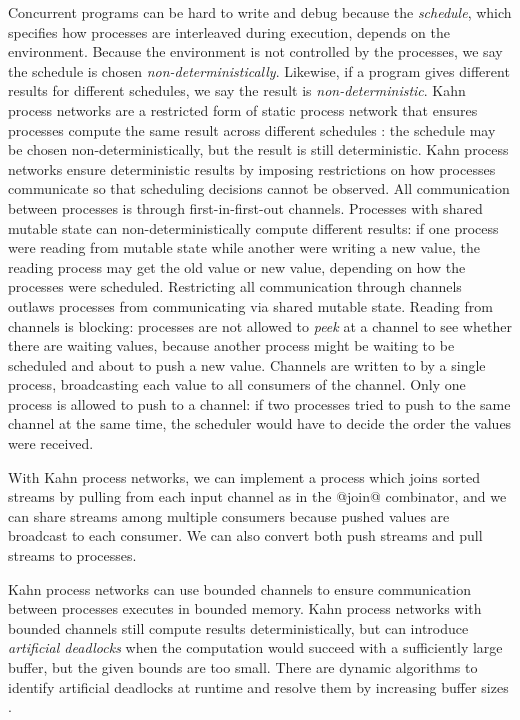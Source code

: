 Concurrent programs can be hard to write and debug because the \emph{schedule}, which specifies how processes are interleaved during execution, depends on the environment.
Because the environment is not controlled by the processes, we say the schedule is chosen \emph{non-deterministically}.
Likewise, if a program gives different results for different schedules, we say the result is \emph{non-deterministic}.
Kahn process networks are a restricted form of static process network that ensures processes compute the same result across different schedules \cite{kahn1976coroutines}: the schedule may be chosen non-deterministically, but the result is still deterministic.
Kahn process networks ensure deterministic results by imposing restrictions on how processes communicate so that scheduling decisions cannot be observed.
All communication between processes is through first-in-first-out channels.
Processes with shared mutable state can non-deterministically compute different results: if one process were reading from mutable state while another were writing a new value, the reading process may get the old value or new value, depending on how the processes were scheduled.
Restricting all communication through channels outlaws processes from communicating via shared mutable state.
Reading from channels is blocking: processes are not allowed to \emph{peek} at a channel to see whether there are waiting values, because another process might be waiting to be scheduled and about to push a new value.
Channels are written to by a single process, broadcasting each value to all consumers of the channel.
Only one process is allowed to push to a channel: if two processes tried to push to the same channel at the same time, the scheduler would have to decide the order the values were received.

With Kahn process networks, we can implement a process which joins sorted streams by pulling from each input channel as in the @join@ combinator, and we can share streams among multiple consumers because pushed values are broadcast to each consumer.
We can also convert both push streams and pull streams to processes.

Kahn process networks can use bounded channels to ensure communication between processes executes in bounded memory.
Kahn process networks with bounded channels still compute results deterministically, but can introduce \emph{artificial deadlocks} when the computation would succeed with a sufficiently large buffer, but the given bounds are too small.
There are dynamic algorithms to identify artificial deadlocks at runtime and resolve them by increasing buffer sizes \cite{parks1995bounded,geilen2003requirements}.


